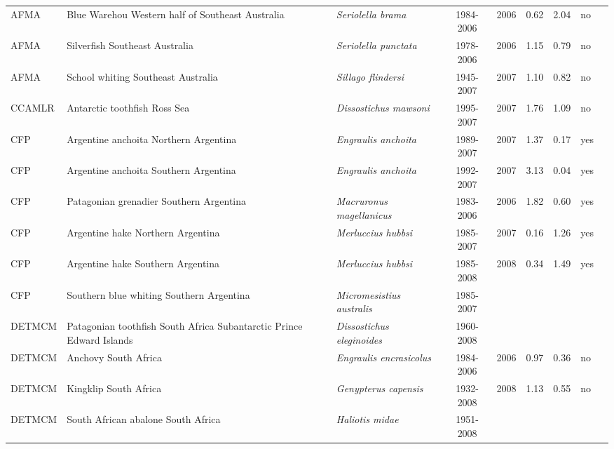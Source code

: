 \begin{longtable}{p{1.8cm}p{4cm}p{4cm}ccccp{1.9cm}c}
  AFMA & Blue Warehou Western half of Southeast Australia & \textit{Seriolella brama} & 1984-2006 & 2006 & 0.62 & 2.04 & no & \cite{WAREHOUSE.pdf} \\ 
  AFMA & Silverfish Southeast Australia & \textit{Seriolella punctata} & 1978-2006 & 2006 & 1.15 & 0.79 & no & \cite{SILVERFISHSE.pdf} \\ 
  AFMA & School whiting Southeast Australia & \textit{Sillago flindersi} & 1945-2007 & 2007 & 1.10 & 0.82 & no & \cite{SWHITSE.pdf} \\ 
  CCAMLR & Antarctic toothfish Ross Sea & \textit{Dissostichus mawsoni} & 1995-2007 & 2007 & 1.76 & 1.09 & no & \cite{ATOOTHFISHRS.pdf} \\ 
  CFP & Argentine anchoita Northern Argentina & \textit{Engraulis anchoita} & 1989-2007 & 2007 & 1.37 & 0.17 & yes & \cite{Hansen-ANCHOVY-N-2007.pdf} \\ 
  CFP & Argentine anchoita Southern Argentina & \textit{Engraulis anchoita} & 1992-2007 & 2007 & 3.13 & 0.04 & yes & \cite{Hansen-ANCHOVY-S-2007.pdf} \\ 
  CFP & Patagonian grenadier Southern Argentina & \textit{Macruronus magellanicus} & 1983-2006 & 2006 & 1.82 & 0.60 & yes & \cite{Giussi-hoki-2007.pdf} \\ 
  CFP & Argentine hake Northern Argentina & \textit{Merluccius hubbsi} & 1985-2007 & 2007 & 0.16 & 1.26 & yes & \cite{Irusta-hake-N-2007.pdf} \\ 
  CFP & Argentine hake Southern Argentina & \textit{Merluccius hubbsi} & 1985-2008 & 2008 & 0.34 & 1.49 & yes & \cite{Renzi-hake-S-2009.pdf} \\ 
  CFP &  Southern blue whiting Southern Argentina & \textit{Micromesistius australis} & 1985-2007 &  &  &  &  & \cite{Giussi-polaca-2007.pdf} \\ 
  DETMCM & Patagonian toothfish South Africa Subantarctic Prince Edward Islands & \textit{Dissostichus eleginoides} & 1960-2008 &  &  &  &  & \cite{Branch-SA-Toothfish-2007.pdf} \\ 
  DETMCM & Anchovy South Africa & \textit{Engraulis encrasicolus} & 1984-2006 & 2006 & 0.97 & 0.36 & no & \cite{ANCHOSA.pdf} \\ 
  DETMCM & Kingklip South Africa & \textit{Genypterus capensis} & 1932-2008 & 2008 & 1.13 & 0.55 & no & \cite{Branch-SA-Kingklip-2008.pdf} \\ 
  DETMCM & South African abalone South Africa & \textit{Haliotis midae} & 1951-2008 &  &  &  &  & \cite{Plaganyi-SA-abalone-2008 NOV SWG-AB 21.pdf} \\ 

\end{longtable}
